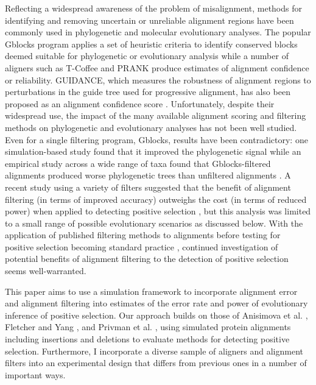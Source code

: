 Reflecting a widespread awareness of the problem of misalignment,
methods for identifying and removing uncertain or unreliable alignment
regions have been commonly used in phylogenetic and molecular
evolutionary analyses. The popular Gblocks program applies a set of
heuristic criteria to identify conserved blocks deemed suitable for
phylogenetic or evolutionary analysis \citep{Castresana2000Selection}
while a number of aligners such as T-Coffee
\citep{Notredame2000TCoffee} and PRANK
\citep{Loytynoja2008PhylogenyAware} produce estimates of alignment
confidence or reliability. GUIDANCE, which measures the robustness of
alignment regions to perturbations in the guide tree used for
progressive alignment, has also been proposed as an alignment
confidence score \citep{Penn2010Alignment}. Unfortunately, despite
their widespread use, the impact of the many available alignment
scoring and filtering methods on phylogenetic and evolutionary
analyses has not been well studied. Even for a single filtering
program, Gblocks, results have been contradictory: one
simulation-based study found that it improved the phylogenetic signal
\citep{Talavera2007Improvement} while an empirical study across a wide
range of taxa found that Gblocks-filtered alignments produced worse
phylogenetic trees than unfiltered alignments
\citep{Dessimoz2010Phylogenetic}. A recent study using a variety of
filters suggested that the benefit of alignment filtering (in terms of
improved accuracy) outweighs the cost (in terms of reduced power) when
applied to detecting positive selection \citep{Privman2011Improving},
but this analysis was limited to a small range of possible
evolutionary scenarios as discussed below.  With the application of
published filtering methods to alignments before testing for positive
selection becoming standard practice
\citep{Studer2008Pervasive,Aguileta2009Rapidly}, continued
investigation of potential benefits of alignment filtering to the
detection of positive selection seems well-warranted.

This paper aims to use a simulation framework to incorporate alignment
error and alignment filtering into estimates of the error rate and
power of \sw evolutionary inference of positive selection. Our
approach builds on those of Anisimova et al.
\citeyearpar{Anisimova2002Accuracy}, Fletcher and Yang
\citeyearpar{Fletcher2010Effect}, and Privman et
al. \citeyearpar{Privman2011Improving}, using simulated protein
alignments including insertions and deletions to evaluate methods for
detecting \sw positive selection. Furthermore, I incorporate a
diverse sample of aligners and alignment filters into an experimental
design that differs from previous ones in a number of important ways.

